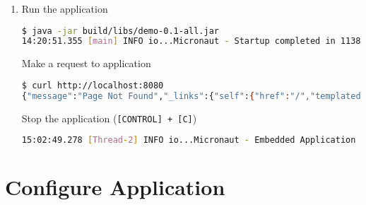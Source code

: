 \documentclass[12pt, letterpaper]{article}
\begin{document}
\begin{enumerate}
	\item Run the application

	      \begin{lstlisting}[language=bash]
$ java -jar build/libs/demo-0.1-all.jar
14:20:51.355 [main] INFO io...Micronaut - Startup completed in 1138ms. Server Running: http://localhost:8080
	      \end{lstlisting}

	      Make a request to application

	      \begin{lstlisting}[language=bash]
$ curl http://localhost:8080
{"message":"Page Not Found","_links":{"self":{"href":"/","templated":false}}}
	      \end{lstlisting}

	      Stop the application (\texttt{[CONTROL] + [C]})

	      \begin{lstlisting}[language=bash]
15:02:49.278 [Thread-2] INFO io...Micronaut - Embedded Application shutting down
	      \end{lstlisting}

\end{enumerate}

\section{Configure Application}\label{sec:configuration}
\end{document}
